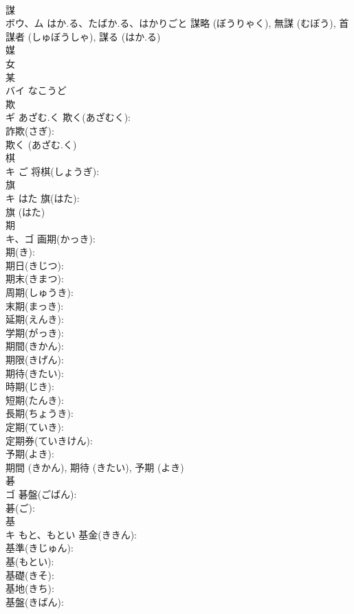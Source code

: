 \documentclass[8pt]{extreport}
\begin{document}
\begin{CJK}{UTF8}{min}
\\	謀			
\\	ボウ、ム	はか.る、たばか.る、はかりごと		謀略 (ぼうりゃく), 無謀 (むぼう), 首謀者 (しゅぼうしゃ), 謀る (はか.る)
\\	媒			
\\	女 
\\	某
\\	バイ	なこうど		
\\	欺			
\\	ギ	あざむ.く	欺く(あざむく): 
\\	詐欺(さぎ): 
\\	欺く (あざむ.く)
\\	棋			
\\	キ	ご	将棋(しょうぎ): 
\\	旗			
\\	キ	はた	旗(はた): 
\\	旗 (はた)
\\	期			
\\	キ、ゴ		画期(かっき): 
\\	期(き): 
\\	期日(きじつ): 
\\	期末(きまつ): 
\\	周期(しゅうき): 
\\	末期(まっき): 
\\	延期(えんき): 
\\	学期(がっき): 
\\	期間(きかん): 
\\	期限(きげん): 
\\	期待(きたい): 
\\	時期(じき): 
\\	短期(たんき): 
\\	長期(ちょうき): 
\\	定期(ていき): 
\\	定期券(ていきけん): 
\\	予期(よき): 
\\	期間 (きかん), 期待 (きたい), 予期 (よき)
\\	碁			
\\	ゴ		碁盤(ごばん): 
\\	碁(ご): 
\\	基			
\\	キ	もと、もとい	基金(ききん): 
\\	基準(きじゅん): 
\\	基(もとい): 
\\	基礎(きそ): 
\\	基地(きち): 
\\	基盤(きばん): 

\end{CJK}
\end{document}
